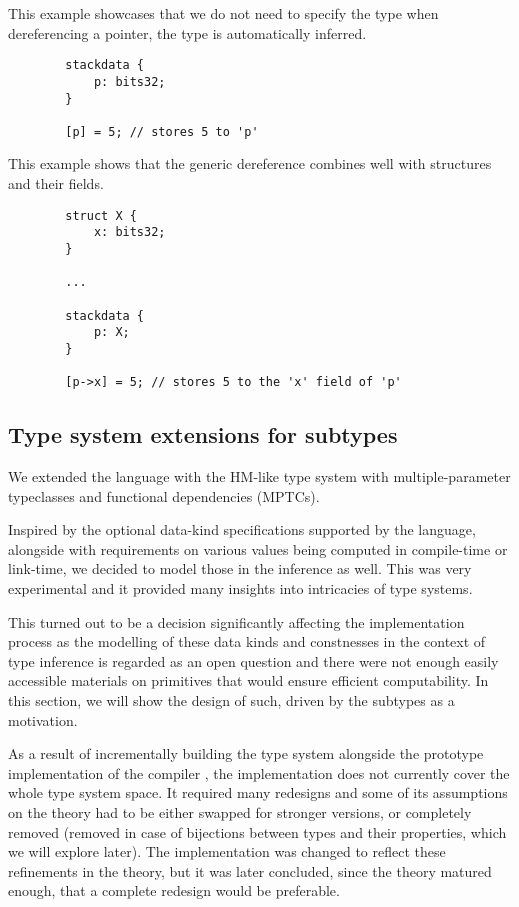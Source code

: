 \begin{ex}
    This example showcases that we do not need to specify the type when dereferencing a pointer, the type is automatically inferred.

    \begin{lstlisting}
        stackdata {
            p: bits32;
        }

        [p] = 5; // stores 5 to 'p'
    \end{lstlisting}
\end{ex}

\begin{ex}
    This example shows that the generic dereference combines well with structures and their fields.

    \begin{lstlisting}
        struct X {
            x: bits32;
        }

        ...

        stackdata {
            p: X;
        }

        [p->x] = 5; // stores 5 to the 'x' field of 'p'
    \end{lstlisting}
\end{ex}

\subsection{Type system extensions for \cmm subtypes}
\label{sec:typesystem}

We extended the language with the HM-like type system with multiple-parameter typeclasses and functional dependencies (MPTCs).

Inspired by the optional data-kind specifications supported by the \cmm language, alongside with requirements on various values being computed in compile-time or link-time, we decided to model those in the inference as well. This was very experimental and it provided many insights into intricacies of type systems.

This turned out to be a decision significantly affecting the implementation process as the modelling of these data kinds and constnesses in the context of type inference is regarded as an open question and there were not enough easily accessible materials on primitives that would ensure efficient computability. In this section, we will show the design of such, driven by the \cmm subtypes as a motivation.

As a result of incrementally building the type system alongside the prototype implementation of the compiler \cite{klepl2022compiler}, the implementation does not currently cover the whole type system space. It required many redesigns and some of its assumptions on the theory had to be either swapped for stronger versions, or completely removed (removed in case of bijections between types and their properties, which we will explore later). The implementation was changed to reflect these refinements in the theory, but it was later concluded, since the theory matured enough, that a complete redesign would be preferable.

